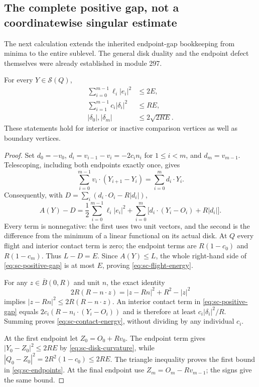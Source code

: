 \subsection{The complete positive gap, not a coordinatewise singular estimate}
The next calculation extends the inherited endpoint-gap bookkeeping from minima to the entire sublevel. The general disk duality and the endpoint defect themselves were already established in module 297.
\begin{sclemma}\label{lem:sc-gap}
For every $Y\in\mathcal S(Q)$,
\begin{align}
 \sum_{i=0}^{m-1}\ell_i|e_i|^2&\le2E,\label{eq:sc-flight-energy}\\
 \sum_{i=1}^{m-1}c_i|\delta_i|^2&\le RE,\label{eq:sc-contact-energy}\\
 |\delta_0|,|\delta_m|&\le2\sqrt{2RE}.\label{eq:sc-endpoints}
\end{align}
These statements hold for interior or inactive comparison vertices as well as boundary vertices.
\end{sclemma}
\begin{proof}
Set $d_0=-v_0$, $d_i=v_{i-1}-v_i=-2c_i n_i$ for $1\le i<m$, and $d_m=v_{m-1}$. Telescoping, including both endpoints exactly once, gives
\[
 \sum_{i=0}^{m-1}v_i\cdot(Y_{i+1}-Y_i)=\sum_{i=0}^m d_i\cdot Y_i.
\]
Consequently, with $D=\sum_i(d_i\cdot O_i-R|d_i|)$,
\begin{equation}\label{eq:sc-positive-gap}
 A(Y)-D=\frac12\sum_{i=0}^{m-1}\ell_i|e_i|^2+
 \sum_{i=0}^m\bigl[d_i\cdot(Y_i-O_i)+R|d_i|\bigr].
\end{equation}
Every term is nonnegative: the first uses two unit vectors, and the second is the difference from the minimum of a linear functional on its actual disk. At $Q$ every flight and interior contact term is zero; the endpoint terms are $R(1-c_0)$ and $R(1-c_m)$. Thus $L-D=E$. Since $A(Y)\le L$, the whole right-hand side of \eqref{eq:sc-positive-gap} is at most $E$, proving \eqref{eq:sc-flight-energy}.

For any $z\in\overline B(0,R)$ and unit $n$, the exact identity
\begin{equation}\label{eq:sc-disk-curvature}
 2R(R-n\cdot z)=|z-Rn|^2+R^2-|z|^2
\end{equation}
implies $|z-Rn|^2\le2R(R-n\cdot z)$. An interior contact term in \eqref{eq:sc-positive-gap} equals $2c_i(R-n_i\cdot(Y_i-O_i))$ and is therefore at least $c_i|\delta_i|^2/R$. Summing proves \eqref{eq:sc-contact-energy}, without dividing by any individual $c_i$.

At the first endpoint let $Z_0=O_0+Rv_0$. The endpoint term gives $|Y_0-Z_0|^2\le2RE$ by \eqref{eq:sc-disk-curvature}, while $|Q_0-Z_0|^2=2R^2(1-c_0)\le2RE$. The triangle inequality proves the first bound in \eqref{eq:sc-endpoints}. At the final endpoint use $Z_m=O_m-Rv_{m-1}$; the signs give the same bound.
\end{proof}

